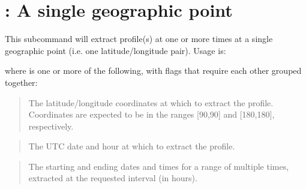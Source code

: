 \documentclass[letterpaper,10pt,english]{sphinxmanual}
\begin{document}
\section{: A single geographic point}
\label{\detokenize{userguide:point-a-single-geographic-point}}
\sphinxAtStartPar
This subcommand will extract profile(s) at one or more times at a single geographic point (i.e. one latitude/longitude pair).  Usage is:

\sphinxAtStartPar
{}

\sphinxAtStartPar
where \sphinxcode{\sphinxupquote{{[}flags{]}}} is one or more of the following, with flags that require each other grouped together:

\sphinxAtStartPar
{}

\sphinxAtStartPar
{}
\begin{quote}

\sphinxAtStartPar
The latitude/longitude coordinates at which to extract the profile.  Coordinates are expected to be in the ranges {[}\sphinxhyphen{}90,90{]} and {[}\sphinxhyphen{}180,180{]}, respectively.
\end{quote}

\sphinxAtStartPar
{}

\sphinxAtStartPar
{}
\begin{quote}

\sphinxAtStartPar
The UTC date and hour  at which to extract the profile.
\end{quote}

\sphinxAtStartPar
{}

\sphinxAtStartPar
{}
\begin{quote}

\sphinxAtStartPar
The starting and ending dates and times for a range of multiple times, extracted at the requested interval (in hours).
\end{quote}
\end{document}
